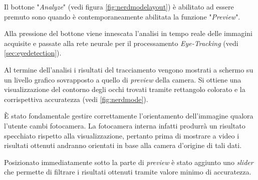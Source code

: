 Il bottone "\textit{Analyze}" (vedi figura \ref{fig:nerdmodelayout}) è abilitato ad essere premuto sono quando è contemporaneamente abilitata la funzione "\textit{Preview}".

Alla pressione del bottone viene innescata l'analisi in tempo reale delle immagini acquisite e passate alla rete neurale per il processamento \textit{Eye-Tracking} (vedi \ref{sec:eyedetection}).

Al termine dell'analisi i risultati del tracciamento vengono mostrati a schermo su un livello grafico sovrapposto a quello di \textit{preview} della camera. Si ottiene una visualizzazione del contorno degli occhi trovati tramite rettangolo colorato e la corrispettiva accuratezza (vedi \ref{fig:nerdmode}).

È stato fondamentale gestire correttamente l'orientamento dell'immagine qualora l'utente cambi fotocamera. La fotocamera interna infatti produrrà un risultato specchiato rispetto alla visualizzazione, pertanto prima di mostrare a video i risultati ottenuti andranno orientati in base alla camera d'origine di tali dati.

Posizionato immediatamente sotto la parte di \textit{preview} è stato aggiunto uno \textit{slider} che permette di filtrare i risultati ottenuti tramite valore minimo di accuratezza.